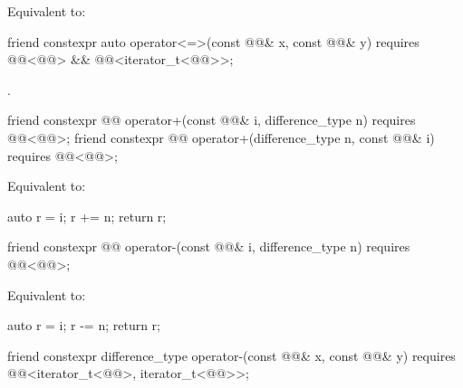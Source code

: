 \begin{itemdescr}
\pnum
\effects
Equivalent to: 
\end{itemdescr}

%
\begin{itemdecl}
friend constexpr auto operator<=>(const @@& x, const @@& y)
  requires @@<@@> &&
           @@<iterator_t<@@>>;
\end{itemdecl}

\begin{itemdescr}
\pnum
\returns
{}.
\end{itemdescr}

%
\begin{itemdecl}
friend constexpr @@ operator+(const @@& i, difference_type n)
  requires @@<@@>;
friend constexpr @@ operator+(difference_type n, const @@& i)
  requires @@<@@>;
\end{itemdecl}

\begin{itemdescr}
\pnum
\effects
Equivalent to:
\begin{codeblock}
auto r = i;
r += n;
return r;
\end{codeblock}
\end{itemdescr}

%
\begin{itemdecl}
friend constexpr @@ operator-(const @@& i, difference_type n)
  requires @@<@@>;
\end{itemdecl}

\begin{itemdescr}
\pnum
\effects
Equivalent to:
\begin{codeblock}
auto r = i;
r -= n;
return r;
\end{codeblock}
\end{itemdescr}

%
\begin{itemdecl}
friend constexpr difference_type operator-(const @@& x, const @@& y)
  requires @@<iterator_t<@@>, iterator_t<@@>>;
\end{itemdecl}

